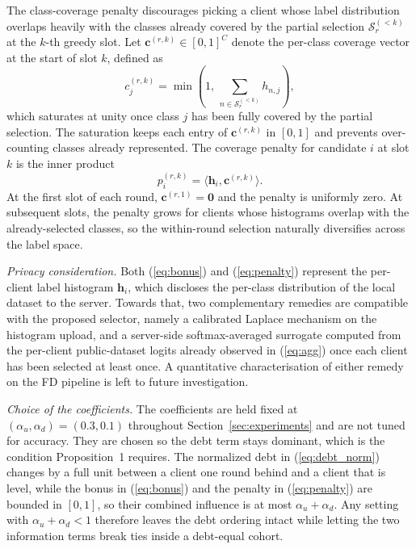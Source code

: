 \documentclass[journal]{IEEEtran}
\newcommand{\new}[1]{#1}
\newcommand{\rev}[1]{#1}
\begin{document}
The class-coverage penalty discourages picking a client whose label distribution overlaps heavily with the classes already covered by the partial selection $\mathcal{S}_r^{(<k)}$ at the $k$-th greedy slot. Let $\bm{c}^{(r,k)} \in [0,1]^{C}$ denote the per-class coverage vector at the start of slot $k$, defined as
\begin{equation}
c_{j}^{(r,k)} = \min\!\left(1,\, \sum_{n \in \mathcal{S}_r^{(<k)}} h_{n,j}\right),
\label{eq:cov}
\end{equation}
which saturates at unity once class $j$ has been fully covered by the partial selection. The saturation keeps each entry of $\bm{c}^{(r,k)}$ in $[0,1]$ and prevents over-counting classes already represented. The coverage penalty for candidate $i$ at slot $k$ is the inner product
\begin{equation}
p_i^{(r,k)} = \langle \bm{h}_i, \bm{c}^{(r,k)} \rangle.
\label{eq:penalty}
\end{equation}
At the first slot of each round, $\bm{c}^{(r,1)} = \bm{0}$ and the penalty is uniformly zero. At subsequent slots, the penalty grows for clients whose histograms overlap with the already-selected classes, so the within-round selection naturally diversifies across the label space.

\new{\textit{Privacy consideration.} Both (\ref{eq:bonus}) and (\ref{eq:penalty}) represent the per-client label histogram $\bm{h}_i$, which discloses the per-class distribution of the local dataset to the server. Towards that, two complementary remedies are compatible with the proposed selector, namely a calibrated Laplace mechanism on the histogram upload, and a server-side softmax-averaged surrogate computed from the per-client public-dataset logits already observed in (\ref{eq:agg}) once each client has been selected at least once. A quantitative characterisation of either remedy on the FD pipeline is left to future investigation.}

\rev{\textit{Choice of the coefficients.} The coefficients are held fixed at $(\alpha_u, \alpha_d) = (0.3, 0.1)$ throughout Section~\ref{sec:experiments} and are not tuned for accuracy. They are chosen so the debt term stays dominant, which is the condition Proposition~1 requires. The normalized debt in (\ref{eq:debt_norm}) changes by a full unit between a client one round behind and a client that is level, while the bonus in (\ref{eq:bonus}) and the penalty in (\ref{eq:penalty}) are bounded in $[0,1]$, so their combined influence is at most $\alpha_u + \alpha_d$. Any setting with $\alpha_u + \alpha_d < 1$ therefore leaves the debt ordering intact while letting the two information terms break ties inside a debt-equal cohort.}
\end{document}
